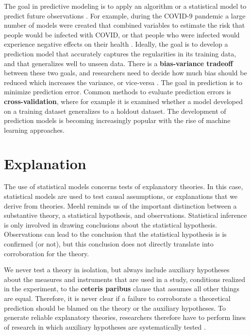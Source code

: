 \documentclass[
]{krantz}
\begin{document}
The goal in predictive modeling is to apply an algorithm or a statistical model to predict future observations \citep{shmueli_explain_2010}. For example, during the COVID-9 pandemic a large number of models were created that combined variables to estimate the risk that people would be infected with COVID, or that people who were infected would experience negative effects on their health \citep{wynants_prediction_2020}. Ideally, the goal is to develop a prediction model that accurately captures the regularities in its training data, and that generalizes well to unseen data. There is a \textbf{bias-variance tradeoff} between these two goals, and researchers need to decide how much bias should be reduced which increases the variance, or vice-versa \citep{yarkoni_choosing_2017}. The goal in prediction is to minimize prediction error. Common methods to evaluate prediction errors is \textbf{cross-validation}, where for example it is examined whether a model developed on a training dataset generalizes to a holdout dataset. The development of prediction models is becoming increasingly popular with the rise of machine learning approaches.

\hypertarget{explanation}{%
\section{Explanation}\label{explanation}}

The use of statistical models concerns tests of explanatory theories. In this case, statistical models are used to test causal assumptions, or explanations that we derive from theories.
Meehl \citeyearpar{meehl_appraising_1990} reminds us of the important distinction between a substantive theory, a statistical hypothesis, and observations. Statistical inference is only involved in drawing conclusions about the statistical hypothesis. Observations can lead to the conclusion that the statistical hypothesis is is confirmed (or not), but this conclusion does not directly translate into corroboration for the theory.

We never test a theory in isolation, but always include auxiliary hypotheses about the measures and instruments that are used in a study, conditions realized in the experiment, to the \textbf{ceteris paribus} clause that assumes all other things are equal. Therefore, it is never clear if a failure to corroborate a theoretical prediction should be blamed on the theory or the auxiliary hypotheses. To generate reliable explanatory theories, researchers therefore have to perform lines of research in which auxiliary hypotheses are systematically tested \citep{tunc_falsificationist_2020}.
\end{document}
